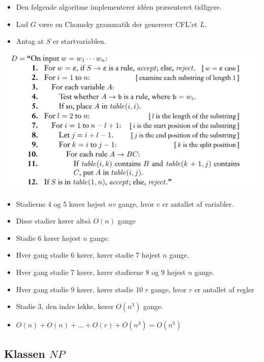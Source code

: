 \begin{frame}[allowframebreaks]
\begin{itemize}
		\item Den følgende algoritme implementerer idéen præsenteret tidligere.
		\item Lad $G$ være en Chomsky grammatik der genererer CFL'et $L$.
		\item Antag at $S$ er startvariablen.
	\end{itemize}
	\includegraphics[scale=0.3]{figur/polycfg.png}
	\begin{itemize}
		\item Stadierne $4$ og $5$ kører højest $nv$ gange, hvor $v$ er antallet af variabler.
		\item Disse stadier kører altså $O(n)$ gange
		\item Stadie 6 kører højest $n$ gange.
		\item Hver gang stadie 6 kører, kører stadie 7 højest $n$ gange.
		\item Hver gang stadie 7 kører, kører stadierne 8 og 9 højest $n$ gange.
		\item Hver gang stadie 9 kører, kører stadie 10 $r$ gange, hvor $r$ er antallet af regler
		\item Stadie 3, den indre løkke, kører $O(n^{3})$ gange.
		\item $O(n) + O(n) + \ldots + O(r) + O(n^{3}) = O(n^{3})$
	\end{itemize}
\end{frame}

\subsection{Klassen $NP$}%
\label{subsec:label}

